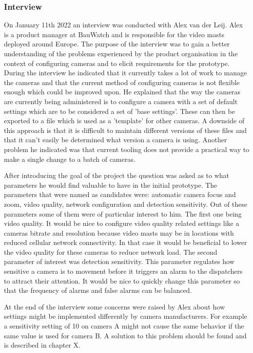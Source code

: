 \subsubsection{Interview}
On January 11th 2022 an interview was conducted with Alex van der Leij. Alex is a product manager at
BauWatch and is responsible for the video masts deployed around Europe. The purpose of the interview was to gain a better understanding of the problems experienced
by the product organisation in the context of configuring cameras and to elicit requirements for the prototype. During the interview he indicated that it currently takes a lot of work to manage
the cameras and that the current method of configuring cameras is not flexible enough which could be improved upon. He explained that the way the cameras are currently being
administered is to configure a camera with a set of default settings which are to be considered a set of 'base settings'. These can then be exported to a file which is used as a
'template' for other
cameras. A downside of this approach is that it is difficult to maintain different versions of these files and that it can't easily be determined what version a camera is using.
Another problem he indicated was that current tooling does not provide a practical way to make a single change to a batch of cameras.


After introducing the goal of the project the question was asked as to what parameters he would find valuable to have in the initial prototype.
The parameters that were named as candidates were: automatic camera focus and zoom, video quality, network configuration and detection sensitivity.
Out of these parameters some of them were of particular interest to him. The first one being video quality. It would be nice to configure video quality related settings like a
cameras bitrate and resolution because video masts may be in locations with reduced cellular network connectivity. In that case it would be beneficial to lower the video quality
for these cameras to reduce network load. The second parameter of interest was detection sensitivity. This parameter regulates how sensitive a camera is to movement before it
triggers an alarm to the dispatchers to attract their attention. It would be nice to quickly change this parameter so that the frequency of alarms and false alarms can be balanced.


At the end of the interview some concerns were raised by Alex about how settings might be implemented differently by camera manufacturers. For example a sensitivity setting of 10
on camera A might not cause the same behavior if the same value is used for camera B. A solution to this problem should be found and is described in chapter X.

